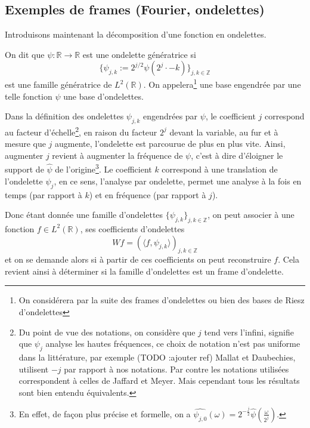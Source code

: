 \subsection{Exemples de frames (Fourier, ondelettes)}
Introduisons maintenant la décomposition d'une fonction en ondelettes.
\begin{definition}
	On dit que $\psi:\mathbb{R} \to \mathbb{R}$ est une ondelette génératrice si 
	\begin{equation}
		\{\psi_{j,k} := 2^{j/2}\psi(2^j\cdot - k)\}_{j,k \in \mathbb{Z}}
	\end{equation}
	est une famille génératrice de $L^2(\mathbb{R})$.
	On appelera\footnote{On considérera par la suite des frames d'ondelettes ou bien des bases de Riesz d'ondelettes} une base engendrée par une telle fonction $\psi$ une base d'ondelettes.
\end{definition}
\begin{remarque}
	Dans la définition des ondelettes $\psi_{j,k}$ engendrées par $\psi$, le coefficient $j$ correspond au facteur d'échelle\footnote{Du point de vue des notations, on considère que $j$ tend vers l'infini, signifie que $\psi_j$ analyse les hautes fréquences, ce choix de notation n'est pas uniforme dans la littérature, par exemple (TODO :ajouter ref) Mallat et Daubechies, utilisent $-j$ par rapport à nos notations. Par contre les notations utilisées correspondent à celles de Jaffard et Meyer. Mais cependant tous les résultats sont bien entendu équivalents.},
	en raison du facteur $2^j$ devant la variable, au fur et à mesure que $j$ augmente, l'ondelette est parcourue de plus en plus vite. Ainsi, augmenter $j$ revient à augmenter la fréquence de $\psi$, c'est à dire d'éloigner le support de $\hat{\psi}$ de l'origine\footnote{En effet, de façon plus précise et formelle, on a $\hat{\psi_{j,0}}(\omega) = 2^{-\frac{j}{2}}\hat{\psi}(\frac{\omega}{2^j})$.}.
	Le coefficient $k$ correspond à une translation de l'ondelette $\psi_j$, en ce sens, l'analyse par ondelette, permet une analyse à la fois en temps (par rapport à $k$) et en fréquence (par rapport à $j$).
\end{remarque}
Donc étant donnée une famille d'ondelettes $\{\psi_{j,k}\}_{j,k \in \mathbb{Z}}$, on peut associer à une fonction $f\in L^2(\mathbb{R})$, ses coefficients d'ondelettes
\begin{equation}
	Wf = (\langle f, \psi_{j,k} \rangle )_{j,k \in \mathbb{Z}}
\end{equation}
et on se demande alors si à partir de ces coefficients on peut reconstruire $f$.
Cela revient ainsi à déterminer si la famille d'ondelettes est un frame d'ondelette. 
